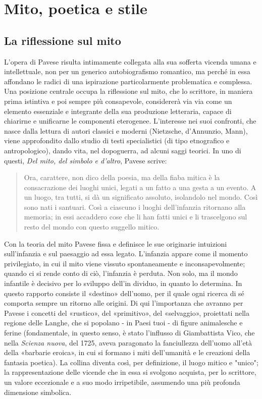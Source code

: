 \documentclass[a4paper, twoside, titlepage]{book}
\newcommand{\citazione}[1]{%
  \begin{quotation}
  \begin{linenumbers}
  \modulolinenumbers[5]
  \begingroup
  \setlength{\parindent}{0cm}
  \noindent #1
  \endgroup
  \end{linenumbers}
  \end{quotation}\setcounter{linenumber}{1}
  }
\begin{document}
\section{Mito, poetica e stile}

\subsection{La riflessione sul mito}

L'opera di Pavese risulta intimamente collegata alla sua sofferta vicenda umana e intellettuale, non per un generico autobiografismo romantico, ma perché in essa affondano le radici di una ispirazione particolarmente problematica e complessa. Una posizione centrale occupa la riflessione sul mito, che lo scrittore, in maniera prima istintiva e poi sempre più consapevole, considererà via via come un elemento essenziale e integrante della sua produzione letteraria, capace di chiarirne e unificarne le componenti eterogenee. L'interesse nei suoi confronti, che nasce dalla lettura di autori classici e moderni (Nietzsche, d'Annunzio, Mann), viene approfondito dallo studio di testi specialistici (di tipo etnografico e antropologico), dando vita, nel dopoguerra, ad alcuni saggi teorici. In uno di questi, \textit{Del mito, del simbolo e d'altro}, Pavese scrive:

\citazione{ Ora, carattere, non dico della poesia, ma della fiaba mitica è la consacrazione dei luoghi unici, legati a un fatto a una gesta a un evento. A un luogo, tra tutti, si dà un significato assoluto, isolandolo nel mondo. Così sono nati i santuari. Così a ciascuno i luoghi dell'infanzia ritornano alla memoria; in essi accaddero cose che li han fatti unici e li trascelgono sul resto del mondo con questo suggello mitico.}

Con la teoria del mito Pavese fissa e definisce le sue originarie intuizioni sull'infanzia e sul paesaggio ad essa legato. L'infanzia appare come il momento privilegiato, in cui il mito viene vissuto spontaneamente e inconsapevolmente; quando ci si rende conto di ciò, l'infanzia è perduta. Non solo, ma il mondo infantile è decisivo per lo sviluppo dell'in dividuo, in quanto lo determina. In questo rapporto consiste il «destino» dell'uomo, per il quale ogni ricerca di sé comporta sempre un ritorno alle origini. Di qui l'importanza che avranno per Pavese i concetti del «rustico», del «primitivo», del «selvaggio», proiettati nella regione delle Langhe, che si popolano - in Paesi tuoi - di figure animalesche e ferine (fondamentale, in questo senso, è stato l'influsso di Giambattista Vico, che nella \textit{Scienza nuova}, del 1725, aveva paragonato la fanciullezza dell'uomo all'età della «barbarie eroica», in cui si formano i miti dell'umanità e le creazioni della fantasia poetica). La collina diventa così, per definizione, il luogo mitico e "unico"; la rappresentazione delle vicende che in essa si svolgono acquista, per lo scrittore, un valore eccezionale e a suo modo irripetibile, assumendo una più profonda dimensione simbolica.
\end{document}
